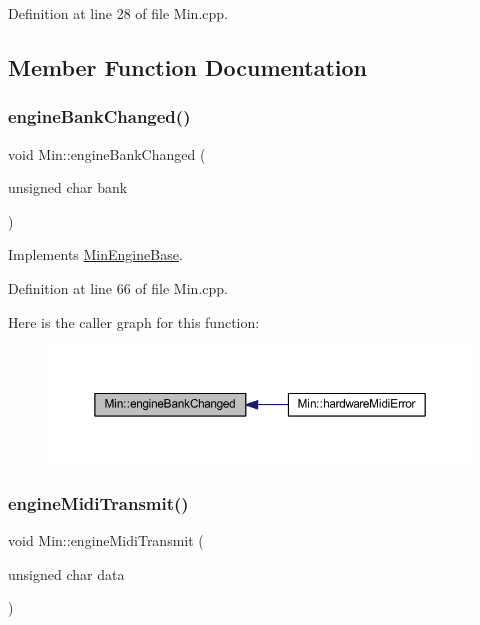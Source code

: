 Definition at line 28 of file Min.\+cpp.



\subsection{Member Function Documentation}
\mbox{\label{class_min_a24ca9b52ba9755b458f6141d730bb9b1}} 
\subsubsection{\texorpdfstring{engine\+Bank\+Changed()}{engineBankChanged()}}
{\footnotesize\ttfamily void Min\+::engine\+Bank\+Changed (\begin{DoxyParamCaption}\item[{unsigned char}]{bank }\end{DoxyParamCaption})\hspace{0.3cm}{\ttfamily [virtual]}}



Implements \hyperlink{class_min_engine_base_a7c1b890b5c7f0004969304880aaaf563}{Min\+Engine\+Base}.



Definition at line 66 of file Min.\+cpp.

Here is the caller graph for this function\+:
\nopagebreak
\begin{figure}[H]
\begin{center}
\leavevmode
\includegraphics[width=350pt]{class_min_a24ca9b52ba9755b458f6141d730bb9b1_icgraph}
\end{center}
\end{figure}
\mbox{\label{class_min_a4b150119664bd46bd2a80561862ff666}} 
\subsubsection{\texorpdfstring{engine\+Midi\+Transmit()}{engineMidiTransmit()}}
{\footnotesize\ttfamily void Min\+::engine\+Midi\+Transmit (\begin{DoxyParamCaption}\item[{unsigned char}]{data }\end{DoxyParamCaption})\hspace{0.3cm}{\ttfamily [virtual]}}



